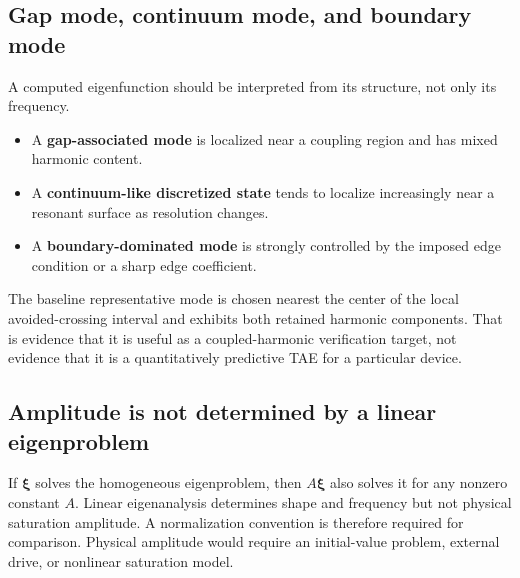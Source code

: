 \subsection{Gap mode, continuum mode, and boundary mode}
A computed eigenfunction should be interpreted from its structure, not only its frequency.
\begin{itemize}[leftmargin=1.6em]
\item A \textbf{gap-associated mode} is localized near a coupling region and has mixed harmonic content.
\item A \textbf{continuum-like discretized state} tends to localize increasingly near a resonant surface as resolution changes.
\item A \textbf{boundary-dominated mode} is strongly controlled by the imposed edge condition or a sharp edge coefficient.
\end{itemize}
The baseline representative mode is chosen nearest the center of the local avoided-crossing interval and exhibits both retained harmonic components. That is evidence that it is useful as a coupled-harmonic verification target, not evidence that it is a quantitatively predictive TAE for a particular device.

\subsection{Amplitude is not determined by a linear eigenproblem}
If $\boldsymbol\xi$ solves the homogeneous eigenproblem, then $A\boldsymbol\xi$ also solves it for any nonzero constant $A$. Linear eigenanalysis determines shape and frequency but not physical saturation amplitude. A normalization convention is therefore required for comparison. Physical amplitude would require an initial-value problem, external drive, or nonlinear saturation model.
